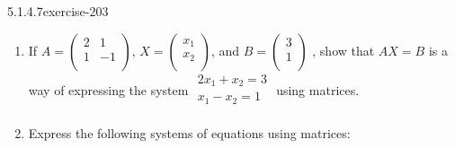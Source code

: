 \documentclass[twoside,10pt,]{book}
\numberwithin{equation}{section}
\begin{document}
\begin{divisionsolution}{5.1.4.7}{}{exercise-203}%
\hypertarget{p-1774}{}%
\leavevmode%
\begin{enumerate}[label=(\alph*)]
\item\hypertarget{li-935}{}\hypertarget{p-1775}{}%
If \(A =\left(
\begin{array}{cc}
2 & 1 \\
1 & -1 \\
\end{array}
\right)\), \(X =\left(
\begin{array}{c}
x_1 \\
x_2 \\
\end{array}
\right)\), and \(B =\left(
\begin{array}{c}
3 \\
1 \\
\end{array}
\right)\) , show that \(A X =B\) is a way of expressing the system \(\begin{array}{c}2x_1 + x_2 = 3\\ x_1 - x_2= 1\\
\end{array}\)  using matrices.%
\item\hypertarget{li-936}{}\hypertarget{p-1776}{}%
Express the following systems of equations using matrices:%
\par
\hypertarget{p-1777}{}%
%
\begin{multicols}{2}
\end{multicols}
\end{enumerate}
\end{divisionsolution}
\end{document}
